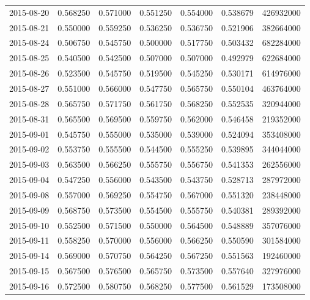 \begin{tabular}{lrrrrrr}
2015-08-20 &    0.568250 &    0.571000 &    0.551250 &    0.554000 &    0.538679 &   426932000 \\
2015-08-21 &    0.550000 &    0.559250 &    0.536250 &    0.536750 &    0.521906 &   382664000 \\
2015-08-24 &    0.506750 &    0.545750 &    0.500000 &    0.517750 &    0.503432 &   682284000 \\
2015-08-25 &    0.540500 &    0.542500 &    0.507000 &    0.507000 &    0.492979 &   622684000 \\
2015-08-26 &    0.523500 &    0.545750 &    0.519500 &    0.545250 &    0.530171 &   614976000 \\
2015-08-27 &    0.551000 &    0.566000 &    0.547750 &    0.565750 &    0.550104 &   463764000 \\
2015-08-28 &    0.565750 &    0.571750 &    0.561750 &    0.568250 &    0.552535 &   320944000 \\
2015-08-31 &    0.565500 &    0.569500 &    0.559750 &    0.562000 &    0.546458 &   219352000 \\
2015-09-01 &    0.545750 &    0.555000 &    0.535000 &    0.539000 &    0.524094 &   353408000 \\
2015-09-02 &    0.553750 &    0.555500 &    0.544500 &    0.555250 &    0.539895 &   344044000 \\
2015-09-03 &    0.563500 &    0.566250 &    0.555750 &    0.556750 &    0.541353 &   262556000 \\
2015-09-04 &    0.547250 &    0.556000 &    0.543500 &    0.543750 &    0.528713 &   287972000 \\
2015-09-08 &    0.557000 &    0.569250 &    0.554750 &    0.567000 &    0.551320 &   238448000 \\
2015-09-09 &    0.568750 &    0.573500 &    0.554500 &    0.555750 &    0.540381 &   289392000 \\
2015-09-10 &    0.552500 &    0.571500 &    0.550000 &    0.564500 &    0.548889 &   357076000 \\
2015-09-11 &    0.558250 &    0.570000 &    0.556000 &    0.566250 &    0.550590 &   301584000 \\
2015-09-14 &    0.569000 &    0.570750 &    0.564250 &    0.567250 &    0.551563 &   192460000 \\
2015-09-15 &    0.567500 &    0.576500 &    0.565750 &    0.573500 &    0.557640 &   327976000 \\
2015-09-16 &    0.572500 &    0.580750 &    0.568250 &    0.577500 &    0.561529 &   173508000 \\

\end{tabular}
